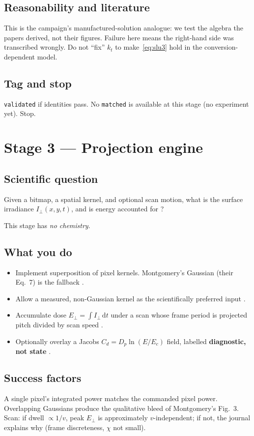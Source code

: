 \documentclass[11pt,a4paper]{article}
\newcommand{\tagvalid}{\texttt{validated}}
\newcommand{\tagmatch}{\texttt{matched}}
\begin{document}
\subsection{Reasonability and literature}
This is the campaign's manufactured-solution analogue: we test the algebra the papers derived, not their figures.
Failure here means the right-hand side was transcribed wrongly.
Do not ``fix'' $k_t$ to make~\eqref{eq:slu3} hold in the conversion-dependent model.

\subsection{Tag and stop}
\tagvalid{} if identities pass.
No \tagmatch{} is available at this stage (no experiment yet).
Stop.

\section{Stage 3 --- Projection engine}

\subsection{Scientific question}
Given a bitmap, a spatial kernel, and optional scan motion, what is the surface irradiance $I_\perp(x,y,t)$, and is energy accounted for \citep{Meenakshisundaram2020,Montgomery2022}?

This stage has \emph{no chemistry}.

\subsection{What you do}
\begin{itemize}
  \item Implement superposition of pixel kernels. Montgomery's Gaussian (their Eq.~7) is the fallback \citep{Montgomery2022}.
  \item Allow a measured, non-Gaussian kernel as the scientifically preferred input \citep{Meenakshisundaram2020}.
  \item Accumulate dose $E_\perp=\int I_\perp\,\mathrm{d}t$ under a scan whose frame period is projected pitch divided by scan speed \citep{Meenakshisundaram2020}.
  \item Optionally overlay a Jacobs $C_d=D_p\ln(E/E_c)$ field, labelled \textbf{diagnostic, not state} \citep{Jacobs1992book}.
\end{itemize}

\subsection{Success factors}
A single pixel's integrated power matches the commanded pixel power.
Overlapping Gaussians produce the qualitative bleed of Montgomery's Fig.~3.
Scan: if dwell $\propto 1/v$, peak $E_\perp$ is approximately $v$-independent; if not, the journal explains why (frame discreteness, $\chi$ not small).
\end{document}
